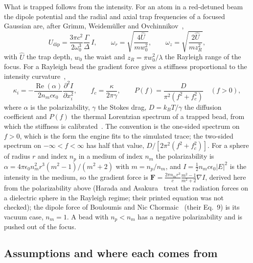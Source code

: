 What is trapped follows from the intensity. For an atom in a red-detuned beam the dipole potential and the radial and axial trap frequencies of a focused Gaussian are, after Grimm, Weidem\"uller and Ovchinnikov~\cite{grimm},
\begin{equation}
U_{\mathrm{dip}}=\frac{3\pi c^2}{2\omega_0^3}\frac{\Gamma}{\Delta}\,I,\qquad \omega_r=\sqrt{\frac{4\hat U}{mw_0^2}},\qquad \omega_z=\sqrt{\frac{2\hat U}{mz_R^2}},
\label{eq:atom}
\end{equation}
with $\hat U$ the trap depth, $w_0$ the waist and $z_R=\pi w_0^2/\lambda$ the Rayleigh range of the focus. For a Rayleigh bead the gradient force gives a stiffness proportional to the intensity curvature~\cite{bouloumis},
\begin{equation}
\kappa_i=-\frac{\operatorname{Re}(\alpha)}{2n_mc\epsilon_0}\frac{\partial^2I}{\partial x_i^2},\qquad f_c=\frac{\kappa}{2\pi\gamma},\qquad P(f)=\frac{D}{\pi^2(f^2+f_c^2)}\quad(f>0),
\label{eq:bead}
\end{equation}
where $\alpha$ is the polarizability, $\gamma$ the Stokes drag, $D=k_BT/\gamma$ the diffusion coefficient and $P(f)$ the thermal Lorentzian spectrum of a trapped bead, from which the stiffness is calibrated~\cite{tolic}. The convention is the one-sided spectrum on $f>0$, which is the form the engine fits to the simulated trace; the two-sided spectrum on $-\infty<f<\infty$ has half that value, $D/[2\pi^2(f^2+f_c^2)]$. For a sphere of radius $r$ and index $n_p$ in a medium of index $n_m$ the polarizability is $\alpha=4\pi\epsilon_0n_m^2r^3(m^2-1)/(m^2+2)$ with $m=n_p/n_m$, and $I=\frac12n_mc\epsilon_0|E|^2$ is the intensity in the medium, so the gradient force is $\mathbf F=\frac{2\pi n_mr^3}{c}\frac{m^2-1}{m^2+2}\nabla I$, derived here from the polarizability above (Harada and Asakura~\cite{harada} treat the radiation forces on a dielectric sphere in the Rayleigh regime; their printed equation was not checked); the dipole force of Bouloumis and Nic Chormaic~\cite{bouloumis} (their Eq.~9) is its vacuum case, $n_m=1$. A bead with $n_p<n_m$ has a negative polarizability and is pushed out of the focus.

\subsection{Assumptions and where each comes from}\label{sec:problem-assume}

